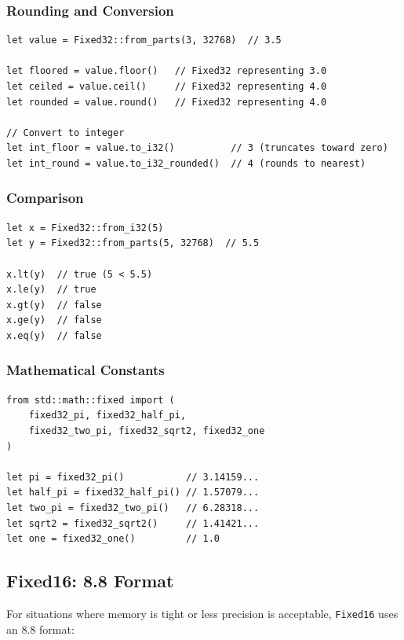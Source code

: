 \subsubsection{Rounding and Conversion}

\begin{lstlisting}
let value = Fixed32::from_parts(3, 32768)  // 3.5

let floored = value.floor()   // Fixed32 representing 3.0
let ceiled = value.ceil()     // Fixed32 representing 4.0
let rounded = value.round()   // Fixed32 representing 4.0

// Convert to integer
let int_floor = value.to_i32()          // 3 (truncates toward zero)
let int_round = value.to_i32_rounded()  // 4 (rounds to nearest)
\end{lstlisting}

\subsubsection{Comparison}

\begin{lstlisting}
let x = Fixed32::from_i32(5)
let y = Fixed32::from_parts(5, 32768)  // 5.5

x.lt(y)  // true (5 < 5.5)
x.le(y)  // true
x.gt(y)  // false
x.ge(y)  // false
x.eq(y)  // false
\end{lstlisting}

\subsubsection{Mathematical Constants}

\begin{lstlisting}
from std::math::fixed import (
    fixed32_pi, fixed32_half_pi,
    fixed32_two_pi, fixed32_sqrt2, fixed32_one
)

let pi = fixed32_pi()           // 3.14159...
let half_pi = fixed32_half_pi() // 1.57079...
let two_pi = fixed32_two_pi()   // 6.28318...
let sqrt2 = fixed32_sqrt2()     // 1.41421...
let one = fixed32_one()         // 1.0
\end{lstlisting}

\subsection{Fixed16: 8.8 Format}

For situations where memory is tight or less precision is acceptable, \texttt{Fixed16} uses an 8.8 format:

